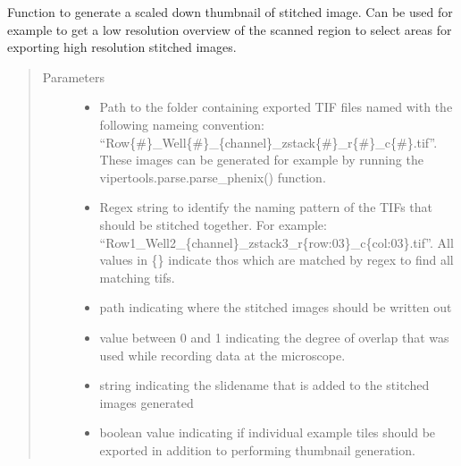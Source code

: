 \documentclass[a4paper,10pt,english,openany,oneside]{sphinxmanual}
\begin{document}
\begin{fulllineitems}
\label{\detokenize{index:vipertools.stitch.generate_thumbnail}}
\sphinxAtStartPar
Function to generate a scaled down thumbnail of stitched image. Can be used for example to
get a low resolution overview of the scanned region to select areas for exporting high resolution
stitched images.
\begin{quote}\begin{description}
\item[{Parameters}] \leavevmode\begin{itemize}
\item {} 
\sphinxAtStartPar
{} \textendash{} Path to the folder containing exported TIF files named with the following nameing convention: “Row\{\#\}\_Well\{\#\}\_\{channel\}\_zstack\{\#\}\_r\{\#\}\_c\{\#\}.tif”.
These images can be generated for example by running the vipertools.parse.parse\_phenix() function.

\item {} 
\sphinxAtStartPar
{} \textendash{} Regex string to identify the naming pattern of the TIFs that should be stitched together.
For example: “Row1\_Well2\_\{channel\}\_zstack3\_r\{row:03\}\_c\{col:03\}.tif”.
All values in \{\} indicate thos which are matched by regex to find all matching tifs.

\item {} 
\sphinxAtStartPar
{} \textendash{} path indicating where the stitched images should be written out

\item {} 
\sphinxAtStartPar
{} \textendash{} value between 0 and 1 indicating the degree of overlap that was used while recording data at the microscope.

\item {} 
\sphinxAtStartPar
{} \textendash{} string indicating the slidename that is added to the stitched images generated

\item {} 
\sphinxAtStartPar
{} \textendash{} boolean value indicating if individual example tiles should be exported in addition to performing thumbnail generation.

\end{itemize}

\end{description}\end{quote}

\end{fulllineitems}
\end{document}
